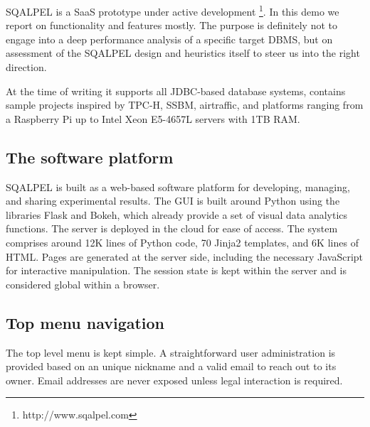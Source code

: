 \documentclass{cidr-2019}
\begin{document}
 
{\sc SQALPEL} is a SaaS prototype under active
development \footnote{http://www.sqalpel.com }. In this demo we
report on functionality and features mostly. The purpose is definitely
not to engage into a deep performance analysis of a specific target
DBMS, but on assessment of the {\sc SQALPEL} design and heuristics
itself to steer us into the right direction.

At the time of writing it supports all JDBC-based database systems,
contains sample projects inspired by TPC-H, SSBM, airtraffic, and
platforms ranging from a Raspberry Pi up to Intel Xeon E5-4657L
servers with 1TB RAM.


\subsection{The software platform}\label{GUI}
{\sc SQALPEL} is built as a web-based software platform
for developing, managing, and sharing experimental results. The GUI is
built around Python using the libraries Flask and Bokeh, which already
provide a set of visual data analytics functions. The server is
deployed in the cloud for ease of access. The system comprises around
12K lines of Python code, 70 Jinja2 templates, and 6K lines of HTML.
Pages are generated at the server side, including the necessary
JavaScript for interactive manipulation.
The session state is kept within the server and is considered global
within a browser.

\subsection{Top menu navigation}
The top level menu is kept simple. A straightforward user
administration is provided based on an unique nickname and a valid
email to reach out to its owner. Email addresses are never exposed
unless legal interaction is required.
\end{document}
